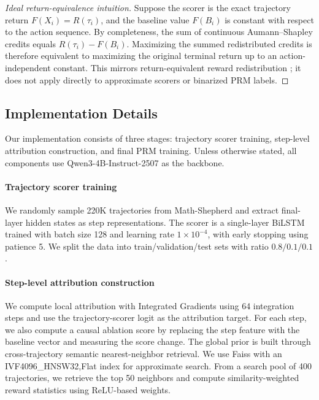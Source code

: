 \begin{proof}[Ideal return-equivalence intuition]
Suppose the scorer is the exact trajectory return \(F(X_i)=R(\tau_i)\), and the
baseline value \(F(B_i)\) is constant with respect to the action sequence.
By completeness, the sum of continuous Aumann--Shapley credits equals
\(R(\tau_i)-F(B_i)\).
Maximizing the summed redistributed credits is therefore equivalent to
maximizing the original terminal return up to an action-independent constant.
This mirrors return-equivalent reward redistribution \citep{arjona2019rudder};
it does not apply directly to approximate scorers or binarized PRM labels.
\end{proof}

\subsection{Implementation Details}
\label{sec:appendix_impl_details}

Our implementation consists of three stages: trajectory scorer training,
step-level attribution construction, and final PRM training.
Unless otherwise stated, all components use Qwen3-4B-Instruct-2507 as the
backbone.

\paragraph{Trajectory scorer training}
We randomly sample 220K trajectories from Math-Shepherd and extract final-layer
hidden states as step representations.
The scorer is a single-layer BiLSTM trained with batch size 128 and learning
rate \(1\times10^{-4}\), with early stopping using patience 5.
We split the data into train/validation/test sets with ratio \(0.8/0.1/0.1\).

\paragraph{Step-level attribution construction}
We compute local attribution with Integrated Gradients using 64 integration
steps and use the trajectory-scorer logit as the attribution target.
For each step, we also compute a causal ablation score by replacing the step
feature with the baseline vector and measuring the score change.
The global prior is built through cross-trajectory semantic nearest-neighbor
retrieval.
We use Faiss \citep{douze2024faiss} with an IVF4096\_HNSW32,Flat index for
approximate search.
From a search pool of 400 trajectories, we retrieve the top 50 neighbors and
compute similarity-weighted reward statistics using ReLU-based weights.

